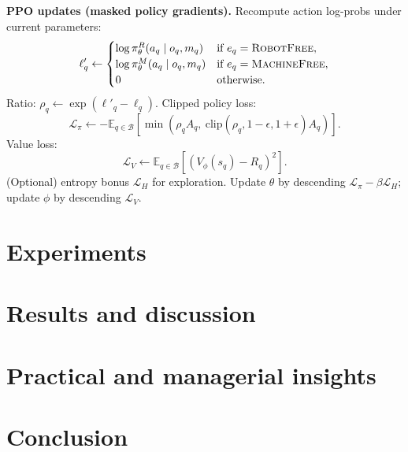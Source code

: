 \documentclass[preprint, 3p, review, 12pt]{elsarticle}
\begin{document}
\begin{algorithm}[t]
\begin{algorithmic}[1]
    \State \textbf{PPO updates (masked policy gradients).}
            \State Recompute action log-probs under current parameters:
            \[
            \ell'_q \leftarrow
            \begin{cases}
            \log \pi_{\theta}^{R}(a_q\mid o_q,m_q) & \text{if } e_q=\textsc{RobotFree},\\
            \log \pi_{\theta}^{M}(a_q\mid o_q,m_q) & \text{if } e_q=\textsc{MachineFree},\\
            0 & \text{otherwise.}
            \end{cases}
            \]
            \State Ratio: $\rho_q \leftarrow \exp(\ell'_q-\ell_q)$.
            \State Clipped policy loss:
            \[
            \mathcal{L}_{\pi} \leftarrow
            -\mathbb{E}_{q\in\mathcal{B}}\left[\min\left(\rho_q A_q,\ \mathrm{clip}(\rho_q,1-\epsilon,1+\epsilon)A_q\right)\right].
            \]
            \State Value loss:
            \[
            \mathcal{L}_{V}\leftarrow \mathbb{E}_{q\in\mathcal{B}}\left[(V_{\phi}(s_q)-R_q)^2\right].
            \]
            \State (Optional) entropy bonus $\mathcal{L}_{H}$ for exploration.
            \State Update $\theta$ by descending $\mathcal{L}_{\pi}-\beta \mathcal{L}_{H}$; update $\phi$ by descending $\mathcal{L}_{V}$.
        \EndFor
    \EndFor
\EndFor
\end{algorithmic}
\end{algorithm}

\section{Experiments}
\label{sec:exp}

\section{Results and discussion}
\label{sec:results}

\section{Practical and managerial insights}
\label{sec:insights}

\section{Conclusion}
\label{sec:conc}
\end{document}
